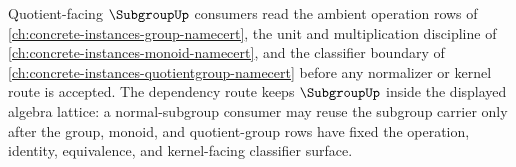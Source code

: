 Quotient-facing $\SubgroupUp$ consumers read the ambient operation rows of \autoref{ch:concrete-instances-group-namecert}, the unit and multiplication discipline of \autoref{ch:concrete-instances-monoid-namecert}, and the classifier boundary of \autoref{ch:concrete-instances-quotientgroup-namecert} before any normalizer or kernel route is accepted. The dependency route keeps $\SubgroupUp$ inside the displayed algebra lattice: a normal-subgroup consumer may reuse the subgroup carrier only after the group, monoid, and quotient-group rows have fixed the operation, identity, equivalence, and kernel-facing classifier surface.
